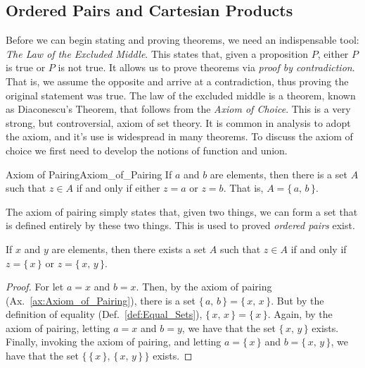     \subsection{Ordered Pairs and Cartesian Products}
        Before we can begin stating and proving theorems, we need an
        indispensable tool: \textit{The Law of the Excluded Middle}. This
        states that, given a proposition $P$, either $P$ is true or $P$ is
        not true. It allows us to prove theorems via
        \textit{proof by contradiction}. That is, we assume the opposite and
        arrive at a contradiction, thus proving the original statement was
        true. The law of the excluded middle is a theorem, known as
        Diaconescu's Theorem, that follows from the \textit{Axiom of Choice}.
        This is a very strong, but controversial, axiom of set theory. It is
        common in analysis to adopt the axiom, and it's use is widespread in
        many theorems. To discuss the axiom of choice we first need to
        develop the notions of function and union.
        \begin{faxiom}{Axiom of Pairing}{Axiom_of_Pairing}
            If $a$ and $b$ are elements, then there is a set $A$ such that
            $z\in{A}$ if and only if either $z=a$ or $z=b$. That is,
            $A=\{\,a,\,b\,\}$.
        \end{faxiom}
        The axiom of pairing simply states that, given two things, we can
        form a set that is defined entirely by these two things. This is
        used to proved \textit{ordered pairs} exist.
        \begin{theorem}
            \label{thm:Existence_of_Ordered_Pair}%
            If $x$ and $y$ are elements, then there exists a set $A$ such
            that $z\in{A}$ if and only if $z=\{\,x\,\}$ or $z=\{\,x,\,y\,\}$.
        \end{theorem}
        \begin{proof}
            For let $a=x$ and $b=x$. Then, by the axiom of pairing
            (Ax.~\ref{ax:Axiom_of_Pairing}), there is a set
            $\{\,a,\,b\,\}=\{\,x,\,x\,\}$. But by the definition of equality
            (Def.~\ref{def:Equal_Sets}), $\{\,x,\,x\,\}=\{\,x\,\}$. Again, by
            the axiom of pairing, letting $a=x$ and $b=y$, we have that the
            set $\{\,x,\,y\,\}$ exists. Finally, invoking the axiom of
            pairing, and letting $a=\{\,x\,\}$ and $b=\{\,x,\,y\,\}$, we have
            that the set $\{\,\{\,x\,\},\,\{\,x,\,y\,\}\,\}$ exists.
        \end{proof}
